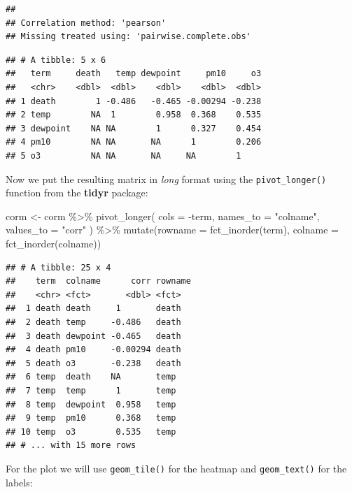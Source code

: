 \documentclass[
]{krantz}
\makeatletter
\newenvironment{Shaded}{\begin{snugshade}}{\end{snugshade}}
\newcommand{\AttributeTok}[1]{\textcolor[rgb]{0.61,0.61,0.61}{#1}}
\newcommand{\FunctionTok}[1]{\textcolor[rgb]{0,0,0}{#1}}
\newcommand{\NormalTok}[1]{#1}
\newcommand{\OtherTok}[1]{\textcolor[rgb]{0.37,0.37,0.37}{#1}}
\newcommand{\SpecialCharTok}[1]{\textcolor[rgb]{0,0,0}{#1}}
\newcommand{\StringTok}[1]{\textcolor[rgb]{0.5,0.5,0.5}{#1}}
\newenvironment{kframe}{%
\medskip{}
\setlength{\fboxsep}{.8em}
 \def\at@end@of@kframe{}%
 \ifinner\ifhmode%
  \def\at@end@of@kframe{\end{minipage}}%
  \begin{minipage}{\columnwidth}%
 \fi\fi%
 \def\FrameCommand##1{\hskip\@totalleftmargin \hskip-\fboxsep
 \colorbox{shadecolor}{##1}\hskip-\fboxsep
     \hskip-\linewidth \hskip-\@totalleftmargin \hskip\columnwidth}%
 \MakeFramed {\advance\hsize-\width
   \@totalleftmargin\z@ \linewidth\hsize
   \@setminipage}}%
 {\par\unskip\endMakeFramed%
 \at@end@of@kframe}
\renewenvironment{Shaded}{\begin{kframe}}{\end{kframe}}
\makeatother
\begin{document}
\begin{verbatim}
## 
## Correlation method: 'pearson'
## Missing treated using: 'pairwise.complete.obs'
\end{verbatim}

\begin{verbatim}
## # A tibble: 5 x 6
##   term     death   temp dewpoint     pm10     o3
##   <chr>    <dbl>  <dbl>    <dbl>    <dbl>  <dbl>
## 1 death        1 -0.486   -0.465 -0.00294 -0.238
## 2 temp        NA  1        0.958  0.368    0.535
## 3 dewpoint    NA NA        1      0.327    0.454
## 4 pm10        NA NA       NA      1        0.206
## 5 o3          NA NA       NA     NA        1
\end{verbatim}

Now we put the resulting matrix in \emph{long} format using the \texttt{pivot\_longer()} function from the \textbf{tidyr} package:

\begin{Shaded}
\begin{Highlighting}[]
\NormalTok{corm }\OtherTok{\textless{}{-}}\NormalTok{ corm }\SpecialCharTok{\%\textgreater{}\%}
  \FunctionTok{pivot\_longer}\NormalTok{(}
    \AttributeTok{cols =} \SpecialCharTok{{-}}\NormalTok{term,}
    \AttributeTok{names\_to =} \StringTok{"colname"}\NormalTok{,}
    \AttributeTok{values\_to =} \StringTok{"corr"}
\NormalTok{  ) }\SpecialCharTok{\%\textgreater{}\%}
  \FunctionTok{mutate}\NormalTok{(}\AttributeTok{rowname =} \FunctionTok{fct\_inorder}\NormalTok{(term),}
         \AttributeTok{colname =} \FunctionTok{fct\_inorder}\NormalTok{(colname))}
\end{Highlighting}
\end{Shaded}

\begin{verbatim}
## # A tibble: 25 x 4
##    term  colname      corr rowname
##    <chr> <fct>       <dbl> <fct>  
##  1 death death     1       death  
##  2 death temp     -0.486   death  
##  3 death dewpoint -0.465   death  
##  4 death pm10     -0.00294 death  
##  5 death o3       -0.238   death  
##  6 temp  death    NA       temp   
##  7 temp  temp      1       temp   
##  8 temp  dewpoint  0.958   temp   
##  9 temp  pm10      0.368   temp   
## 10 temp  o3        0.535   temp   
## # ... with 15 more rows
\end{verbatim}

For the plot we will use \texttt{geom\_tile()} for the heatmap and \texttt{geom\_text()} for the labels:
\end{document}
